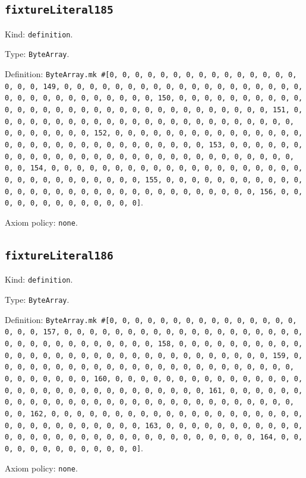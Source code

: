 \documentclass[11pt]{article}
\begin{document}
\subsection*{\texttt{fixtureLiteral185}}
\noindent Kind: \texttt{definition}.\par
\noindent Type: \texttt{ByteArray}.\par
\noindent Definition: \texttt{ByteArray.mk \#[0, 0, 0, 0, 0, 0, 0, 0, 0, 0, 0, 0, 0, 0, 0, 0, 0, 0, 149, 0, 0, 0, 0, 0, 0, 0, 0, 0, 0, 0, 0, 0, 0, 0, 0, 0, 0, 0, 0, 0, 0, 0, 0, 0, 0, 0, 0, 0, 0, 0, 150, 0, 0, 0, 0, 0, 0, 0, 0, 0, 0, 0, 0, 0, 0, 0, 0, 0, 0, 0, 0, 0, 0, 0, 0, 0, 0, 0, 0, 0, 0, 0, 151, 0, 0, 0, 0, 0, 0, 0, 0, 0, 0, 0, 0, 0, 0, 0, 0, 0, 0, 0, 0, 0, 0, 0, 0, 0, 0, 0, 0, 0, 0, 0, 152, 0, 0, 0, 0, 0, 0, 0, 0, 0, 0, 0, 0, 0, 0, 0, 0, 0, 0, 0, 0, 0, 0, 0, 0, 0, 0, 0, 0, 0, 0, 0, 153, 0, 0, 0, 0, 0, 0, 0, 0, 0, 0, 0, 0, 0, 0, 0, 0, 0, 0, 0, 0, 0, 0, 0, 0, 0, 0, 0, 0, 0, 0, 0, 154, 0, 0, 0, 0, 0, 0, 0, 0, 0, 0, 0, 0, 0, 0, 0, 0, 0, 0, 0, 0, 0, 0, 0, 0, 0, 0, 0, 0, 0, 0, 0, 155, 0, 0, 0, 0, 0, 0, 0, 0, 0, 0, 0, 0, 0, 0, 0, 0, 0, 0, 0, 0, 0, 0, 0, 0, 0, 0, 0, 0, 0, 0, 0, 156, 0, 0, 0, 0, 0, 0, 0, 0, 0, 0, 0, 0, 0]}.\par
\noindent Axiom policy: \texttt{none}.\par
\subsection*{\texttt{fixtureLiteral186}}
\noindent Kind: \texttt{definition}.\par
\noindent Type: \texttt{ByteArray}.\par
\noindent Definition: \texttt{ByteArray.mk \#[0, 0, 0, 0, 0, 0, 0, 0, 0, 0, 0, 0, 0, 0, 0, 0, 0, 0, 157, 0, 0, 0, 0, 0, 0, 0, 0, 0, 0, 0, 0, 0, 0, 0, 0, 0, 0, 0, 0, 0, 0, 0, 0, 0, 0, 0, 0, 0, 0, 0, 158, 0, 0, 0, 0, 0, 0, 0, 0, 0, 0, 0, 0, 0, 0, 0, 0, 0, 0, 0, 0, 0, 0, 0, 0, 0, 0, 0, 0, 0, 0, 0, 159, 0, 0, 0, 0, 0, 0, 0, 0, 0, 0, 0, 0, 0, 0, 0, 0, 0, 0, 0, 0, 0, 0, 0, 0, 0, 0, 0, 0, 0, 0, 0, 160, 0, 0, 0, 0, 0, 0, 0, 0, 0, 0, 0, 0, 0, 0, 0, 0, 0, 0, 0, 0, 0, 0, 0, 0, 0, 0, 0, 0, 0, 0, 0, 161, 0, 0, 0, 0, 0, 0, 0, 0, 0, 0, 0, 0, 0, 0, 0, 0, 0, 0, 0, 0, 0, 0, 0, 0, 0, 0, 0, 0, 0, 0, 0, 162, 0, 0, 0, 0, 0, 0, 0, 0, 0, 0, 0, 0, 0, 0, 0, 0, 0, 0, 0, 0, 0, 0, 0, 0, 0, 0, 0, 0, 0, 0, 0, 163, 0, 0, 0, 0, 0, 0, 0, 0, 0, 0, 0, 0, 0, 0, 0, 0, 0, 0, 0, 0, 0, 0, 0, 0, 0, 0, 0, 0, 0, 0, 0, 164, 0, 0, 0, 0, 0, 0, 0, 0, 0, 0, 0, 0, 0]}.\par
\noindent Axiom policy: \texttt{none}.\par
\end{document}

